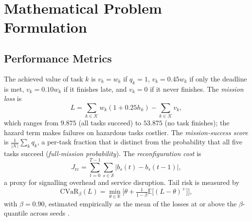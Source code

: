 \documentclass[conference]{IEEEtran}
\begin{document}
\section{Mathematical Problem Formulation}\label{sec:problem}
\subsection{Performance Metrics}
The achieved value of task $k$ is $v_k=w_k$ if $q_k=1$, $v_k=0.45w_k$ if only the deadline is met, $v_k=0.10w_k$ if it finishes late, and $v_k=0$ if it never finishes. The \emph{mission loss} is
\begin{equation}
L=\sum_{k\in\mathcal{K}} w_k(1+0.25h_k) - \sum_{k\in\mathcal{K}} v_k,
\label{eq:loss}
\end{equation}
which ranges from $9.875$ (all tasks succeed) to $53.875$ (no task finishes); the hazard term makes failures on hazardous tasks costlier. The \emph{mission-success score} is $\frac{1}{|\mathcal{K}|}\sum_k q_k$, a per-task fraction that is distinct from the probability that all five tasks succeed (\emph{full-mission probability}). The \emph{reconfiguration cost} is
\begin{equation}
J_{\mathrm{rc}}=\sum_{t=0}^{T-1}\sum_{s\in\mathcal{S}}\big|b_s(t)-b_s(t-1)\big|,
\label{eq:reconfig}
\end{equation}
a proxy for signalling overhead and service disruption. Tail risk is measured by
\begin{equation}
\mathrm{CVaR}_{\beta}(L)=\min_{\theta\in\mathbb{R}}\Big[\theta+\tfrac{1}{1-\beta}\mathbb{E}\big[(L-\theta)^+\big]\Big],
\label{eq:cvar}
\end{equation}
with $\beta=0.90$, estimated empirically as the mean of the losses at or above the $\beta$-quantile across seeds \cite{cvar}.
\end{document}
